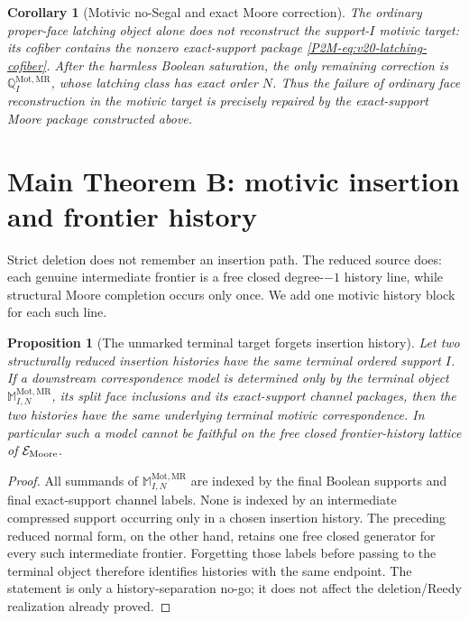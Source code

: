 \documentclass[11pt]{article}
\newtheorem{proposition}[theorem]{Proposition}
\newtheorem{corollary}[theorem]{Corollary}
\theoremstyle{remark}
\newcommand{\Mot}{\mathrm{Mot}}
\newcommand{\MR}{\mathrm{MR}}
\begin{document}
\begin{corollary}[Motivic no-Segal and exact Moore correction]
\label{P2M-cor:v20-motivic-no-segal}
The ordinary proper-face latching object alone does not reconstruct the
support-$I$ motivic target: its cofiber contains the nonzero exact-support
package \eqref{P2M-eq:v20-latching-cofiber}.  After the harmless Boolean
saturation, the only remaining correction is
$\mathbb Q_I^{\Mot,\MR}$, whose latching class has exact order $N$.
Thus the failure of ordinary face reconstruction in the motivic target is
precisely repaired by the exact-support Moore package constructed above.
\end{corollary}


\section{Main Theorem B: motivic insertion and frontier history}

Strict deletion does not remember an insertion path.  The reduced source
does: each genuine intermediate frontier is a free closed degree-\(-1\)
history line, while structural Moore completion occurs only once.  We add
one motivic history block for each such line.

\begin{proposition}[The unmarked terminal target forgets insertion history]
\label{P2M-prop:v21-unmarked-history-collapse}
Let two structurally reduced insertion histories have the same terminal ordered
support $I$.  If a downstream correspondence model is determined only by the
terminal object $\mathbb M_{I,N}^{\Mot,\MR}$, its split face inclusions and its
exact-support channel packages, then the two histories have the same underlying
terminal motivic correspondence.  In particular such a model cannot be faithful
on the free closed frontier-history lattice of $\mathcal E_{\rm Moore}$.
\end{proposition}

\begin{proof}
All summands of $\mathbb M_{I,N}^{\Mot,\MR}$ are indexed by the final Boolean
supports and final exact-support channel labels.  None is indexed by an
intermediate compressed support occurring only in a chosen insertion history.
The preceding reduced normal form, on the other hand, retains one free closed
generator for every such intermediate frontier.  Forgetting those labels before
passing to the terminal object therefore identifies histories with the same
endpoint.  The statement is only a history-separation no-go; it does not affect
the deletion/Reedy realization already proved.
\end{proof}
\end{document}
